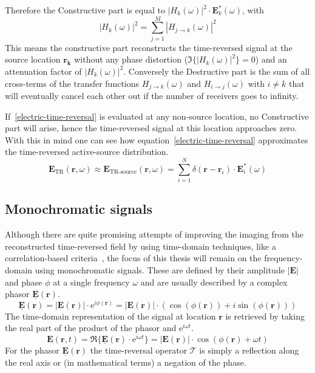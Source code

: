 Therefore the Constructive part is equal to \(|H_k(\omega)|^2 \cdot \bm{E}^*_k(\omega)\), with
\begin{equation}
    |H_k(\omega)|^2 = \sum_{j=1}^{M} |H_{j\rightarrow k}(\omega)|^2
\end{equation}
This means the constructive part reconstructs the time-reversed signal at the source location \(\bm{r_k}\) without any phase distortion (\(\Im \{{|H_k(\omega)|^2}\} = 0\)) and an attenuation factor of \(|H_k(\omega)|^2\).
Conversely the Destructive part is the sum of all cross-terms of the transfer functions \(H_{j\rightarrow k}(\omega)\) and \(H_{i\rightarrow j}(\omega)\) with \(i \neq k\) that will eventually cancel each other out if the number of receivers goes to infinity.

If~\eqref{electric-time-reversal} is evaluated at any non-source location, no Constructive part will arise, hence the time-reversed signal at this location approaches zero.
With this in mind one can see how equation~\eqref{electric-time-reversal} approximates the time-reversed active-source distribution. 
\begin{equation}
    \bm{E}_{\text{TR}}(\bm{r}, \omega) \approx \bm{E}_{\text{TR-source}}(\bm{r}, \omega) =  \sum_{i=1}^{N} \delta(\bm{r}-\bm{r}_i) \cdot \bm{E}^*_i(\omega)
\end{equation}

\subsection{Monochromatic signals}
Although there are quite promising attempts of improving the imaging from the reconstructed time-reversed field by using time-domain techniques, like a correlation-based criteria~\parencite{li_correlation-based_2021}, the focus of this thesis will remain on the frequency-domain using monochromatic signals.
These are defined by their amplitude \(|\bm{E}|\) and phase \(\phi \) at a single frequency \(\omega \) and are usually described by a complex phasor \(\underline{\bm{E}}(\bm{r})\).
\begin{equation}
    \underline{\bm{E}}(\bm{r}) = |\bm{E}(\bm{r})| \cdot \mathrm{e}^{i \phi(\bm{r})} = |\bm{E}(\bm{r})| \cdot (\cos(\phi(\bm{r})) + i \sin(\phi(\bm{r})))
\end{equation}
The time-domain representation of the signal at location \(\bm{r}\) is retrieved by taking the real part of the product of the phasor and \(\mathrm{e}^{i \omega t}\).
\begin{equation}
    \bm{E}(\bm{r}, t) = \Re \{\underline{\bm{E}}(\bm{r}) \cdot \mathrm{e}^{i \omega t}\} = |\bm{E}(\bm{r})| \cdot \cos(\phi(\bm{r}) + \omega t)
\end{equation}
For the phasor \(\underline{\bm{E}}(\bm{r})\) the time-reversal operator \(\mathcal{T}\) is simply a reflection along the real axis or (in mathematical terms) a negation of the phase.

